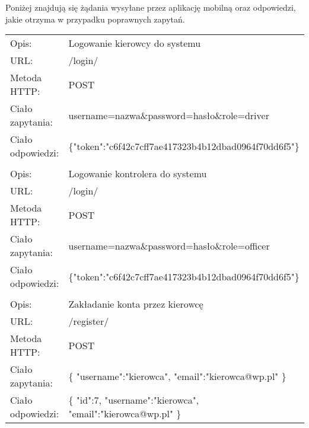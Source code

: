 Poniżej znajdują się żądania wysyłane przez aplikację mobilną oraz odpowiedzi, jakie otrzyma w przypadku poprawnych zapytań.


\vspace{0.5cm}
\label{rest_api}
\begin{longtable}{p{3.5cm}  p{11cm}}
	
	Opis:&Logowanie kierowcy do systemu\\
	URL:&/login/\\
	Metoda HTTP:&POST\\
	Ciało zapytania:&username=nazwa\&password=hasło\&role=driver\\
	Ciało odpowiedzi:&\{"token":"c6f42c7cff7ae417323b4b12dbad0964f70dd6f5"\}\\
	
	&\\
	
	Opis:&Logowanie kontrolera do systemu\\
	URL:&/login/\\
	Metoda HTTP:&POST\\
	Ciało zapytania:&username=nazwa\&password=hasło\&role=officer\\
	Ciało odpowiedzi:&\{"token":"c6f42c7cff7ae417323b4b12dbad0964f70dd6f5"\}\\
	
	&\\
	
	Opis:&Zakładanie konta przez kierowcę\\
	URL:&/register/\\
	Metoda HTTP:&POST\\
	Ciało zapytania:&\{\newline
	\-\hspace{1cm}"username":"kierowca",\newline
	\-\hspace{1cm}"email":"kierowca@wp.pl"\newline
	\}\\
	Ciało odpowiedzi:&\{\newline
	\-\hspace{1cm}"id":7,\newline
	\-\hspace{1cm}"username":"kierowca",\newline
	\-\hspace{1cm}"email":"kierowca@wp.pl"\newline
	\}\\
	

\end{longtable}
